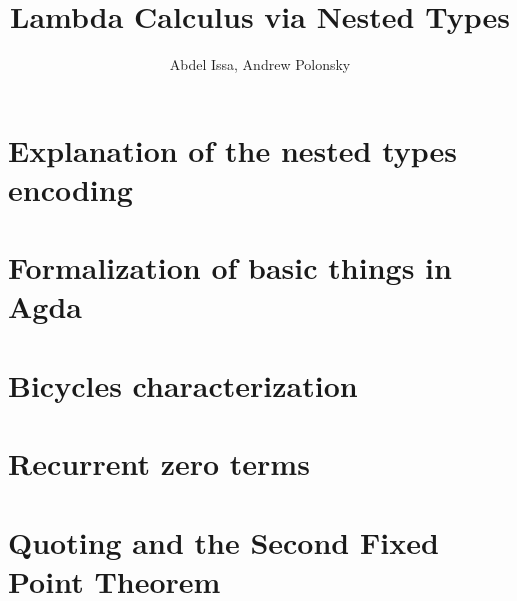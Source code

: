 \documentclass[letterpaper,number=enddot]{scrartcl}
\title{Lambda Calculus via Nested Types}
\author{Abdel Issa, Andrew Polonsky}
\begin{document}
\maketitle

\section{Explanation of the nested types encoding}

\section{Formalization of basic things in Agda}

\section{Bicycles characterization}

\section{Recurrent zero terms}

\section{Quoting and the Second Fixed Point Theorem}
\end{document}
